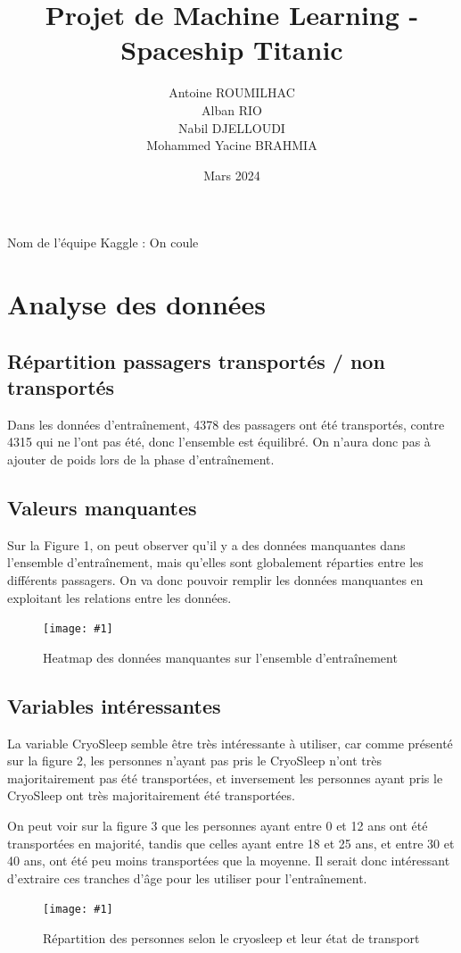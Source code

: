\documentclass[a4paper]{article}
\title{Projet de Machine Learning - Spaceship Titanic}
\author{Antoine ROUMILHAC \\ Alban RIO \\ Nabil DJELLOUDI \\ Mohammed Yacine BRAHMIA}
\date{Mars 2024}
\newcommand{\illustration}[3]{
    \begin{figure}[h!]
        \centering
        \texttt{[image: \#1]}
        \caption{#2}
    \end{figure}
}
\begin{document}
    \maketitle

    Nom de l'équipe Kaggle : On coule

    \section{Analyse des données}

    \subsection{Répartition passagers transportés / non transportés}

    Dans les données d'entraînement, 4378 des passagers ont été transportés, contre 4315 qui ne l'ont pas été, donc l'ensemble est équilibré. On n'aura donc pas à ajouter de poids lors de la phase d'entraînement.

    \subsection{Valeurs manquantes}

    
    Sur la Figure 1, on peut observer qu'il y a des données manquantes dans l'ensemble d'entraînement, mais qu'elles sont globalement réparties entre les différents passagers.
    On va donc pouvoir remplir les données manquantes en exploitant les relations entre les données.
    
    \illustration{images/Figure 1.png}{Heatmap des données manquantes sur l'ensemble d'entraînement}{6cm}
    \subsection{Variables intéressantes}

    La variable CryoSleep semble être très intéressante à utiliser, car comme présenté sur la figure 2, les personnes n'ayant pas pris le CryoSleep n'ont très majoritairement pas été transportées,
    et inversement les personnes ayant pris le CryoSleep ont très majoritairement été transportées.
    
    On peut voir sur la figure 3 que les personnes ayant entre 0 et 12 ans ont été transportées en majorité, 
    tandis que celles ayant entre 18 et 25 ans, et entre 30 et 40 ans, ont été peu moins transportées que la moyenne.
    Il serait donc intéressant d'extraire ces tranches d'âge pour les utiliser pour l'entraînement.
    \illustration{images/Figure 2.png}{Répartition des personnes selon le cryosleep et leur état de transport}{6cm}
\end{document}
